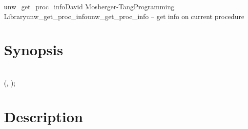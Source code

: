 \documentclass{article}
\begin{document}
\begin{Name}{3}{unw\_get\_proc\_info}{David Mosberger-Tang}{Programming Library}{unw\_get\_proc\_info}unw\_get\_proc\_info -- get info on current procedure
\end{Name}

\section{Synopsis}

\\

 (, );\\

\section{Description}
\end{document}
